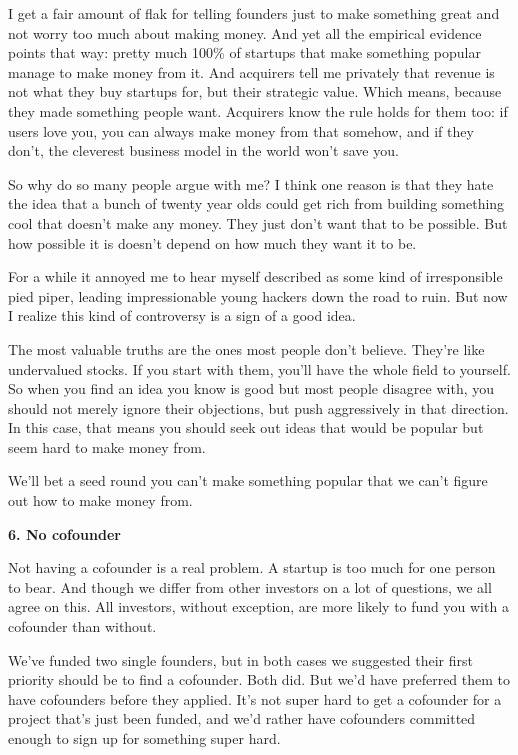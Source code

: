 I get a fair amount of flak for telling founders just to make something
great and not worry too much about making money. And yet all the
empirical evidence points that way: pretty much 100\% of startups that
make something popular manage to make money from it. And acquirers tell
me privately that revenue is not what they buy startups for, but their
strategic value. Which means, because they made something people want.
Acquirers know the rule holds for them too: if users love you, you can
always make money from that somehow, and if they don't, the cleverest
business model in the world won't save you.

So why do so many people argue with me? I think one reason is that they
hate the idea that a bunch of twenty year olds could get rich from
building something cool that doesn't make any money. They just don't
want that to be possible. But how possible it is doesn't depend on how
much they want it to be.

For a while it annoyed me to hear myself described as some kind of
irresponsible pied piper, leading impressionable young hackers down the
road to ruin. But now I realize this kind of controversy is a sign of a
good idea.

The most valuable truths are the ones most people don't believe. They're
like undervalued stocks. If you start with them, you'll have the whole
field to yourself. So when you find an idea you know is good but most
people disagree with, you should not merely ignore their objections, but
push aggressively in that direction. In this case, that means you should
seek out ideas that would be popular but seem hard to make money from.

We'll bet a seed round you can't make something popular that we can't
figure out how to make money from.

\textbf{6. No cofounder}

Not having a cofounder is a real problem. A startup is too much for one
person to bear. And though we differ from other investors on a lot of
questions, we all agree on this. All investors, without exception, are
more likely to fund you with a cofounder than without.

We've funded two single founders, but in both cases we suggested their
first priority should be to find a cofounder. Both did. But we'd have
preferred them to have cofounders before they applied. It's not super
hard to get a cofounder for a project that's just been funded, and we'd
rather have cofounders committed enough to sign up for something super
hard.

